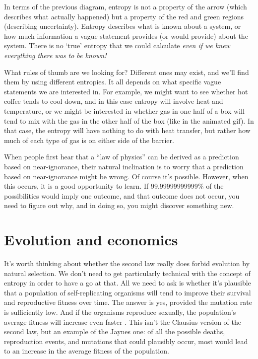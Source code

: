 \documentclass[a4paper, 12pt]{article}
\begin{document}
In terms of the previous diagram, entropy is not a property of the arrow
(which describes what actually happened) but a property of the red and green regions
(describing uncertainty).
Entropy describes what is known about a system, or how much information a
vague statement provides (or would provide) about the system.
There is no `true' entropy that
we could calculate {\em even if we knew everything there was to be known!}

What rules of thumb are we looking for? Different ones may exist, and
we'll find them by using different entropies. It all depends on what
specific vague statements we are interested in.
For example, we might want to
see whether hot coffee tends to cool down, and in this case entropy will involve
heat and temperature, or we might be interested in whether gas in one half of
a box will tend to mix with the gas in the other half of the box (like in the
animated gif). In that case, the entropy will have nothing to do with heat
transfer, but rather how much of each type of gas is on either side of the
barrier.

When people first hear that a ``law of physics'' can be derived as
a prediction based on near-ignorance, their natural inclination is to worry
that a prediction based on near-ignorance might be wrong. Of course it's
possible. However, when this occurs, it is a good opportunity to learn.
If 99.99999999999\% of the possibilities would imply one outcome, and that
outcome does not occur, you need to figure out why, and in doing so, you might
discover something new.

\section*{Evolution and economics}
It's worth thinking about whether the second law really does forbid evolution
by natural selection. We don't need to get particularly technical with the
concept of entropy in order to have a go at that. All we need to ask is whether
it's plausible that a population of self-replicating organisms will tend to
improve their survival and reproductive fitness over time.
The answer is yes, provided the mutation rate is sufficiently
low. And if the organisms reproduce sexually, the population's average fitness
will increase even faster \citep{mackay}. This isn't the Clausius version of
the second law, but an example of the Jaynes one: of all the possible deaths,
reproduction events, and mutations that could plausibly occur, most would lead to
an increase in the average fitness of the population.
\end{document}
